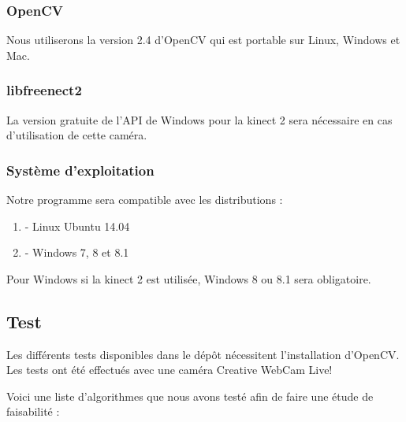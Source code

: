 \documentclass[12pt,a4paper]{article}
\begin{document}
\subsubsection{OpenCV}

Nous utiliserons la version 2.4 d'OpenCV qui est portable sur Linux, Windows et Mac.

\subsubsection{libfreenect2}

La version gratuite de l'API de Windows pour la kinect 2 sera nécessaire en cas d'utilisation de cette caméra.


\subsubsection{Système d'exploitation}

Notre programme sera compatible avec les distributions : 
\begin{enumerate}
\item[] - Linux Ubuntu 14.04
\item[] - Windows 7, 8 et 8.1
\end{enumerate}
Pour Windows si la kinect 2 est utilisée, Windows 8 ou 8.1 sera obligatoire.

\subsection{Test}
Les différents tests disponibles dans le dépôt nécessitent l'installation d'OpenCV.
Les tests ont été effectués avec une caméra Creative WebCam Live!

Voici une liste d'algorithmes que nous avons testé afin de faire une étude de faisabilité : 
\end{document}
